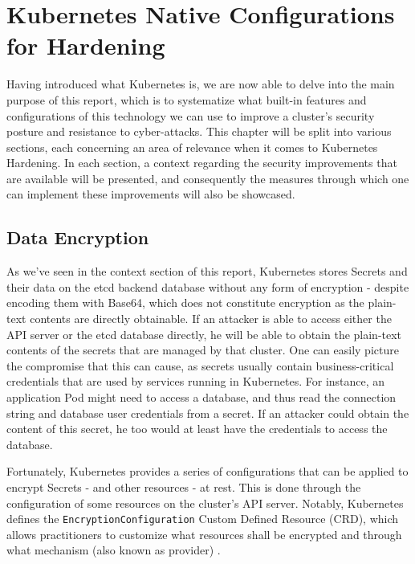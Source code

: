 \documentclass[a4paper,11pt,openright,BCOR=15mm]{scrbook}
\begin{document}
\chapter{Kubernetes Native Configurations for Hardening}
Having introduced what Kubernetes is, we are now able to delve into the main purpose of this report, which is to systematize what built-in features and configurations of this technology we can use to improve a cluster's security posture and resistance to cyber-attacks.
This chapter will be split into various sections, each concerning an area of relevance when it comes to Kubernetes Hardening. In each section, a context regarding the security improvements that are available will be presented, and consequently the measures through which one can implement these improvements will also be showcased.

	\section{Data Encryption}
	
As we've seen in the context section of this report, Kubernetes stores Secrets and their data on the etcd backend database without any form of encryption \cite{the_linux_foundation_secrets_2024} - despite encoding them with Base64, which does not constitute encryption as the plain-text contents are directly obtainable. If an attacker is able to access either the API server or the etcd database directly, he will be able to obtain the plain-text contents of the secrets that are managed by that cluster. One can easily picture the compromise that this can cause, as secrets usually contain business-critical credentials that are used by services running in Kubernetes. For instance, an application Pod might need to access a database, and thus read the connection string and database user credentials from a secret. If an attacker could obtain the content of this secret, he too would at least have the credentials to access the database.

Fortunately, Kubernetes provides a series of configurations that can be applied to encrypt Secrets - and other resources - at rest. This is done through the configuration of some resources on the cluster's API server. Notably, Kubernetes defines the \texttt{EncryptionConfiguration} Custom Defined Resource (CRD), which allows practitioners to customize what resources shall be encrypted and through what mechanism (also known as provider) \cite{the_linux_foundation_encrypting_2024}.
\end{document}
